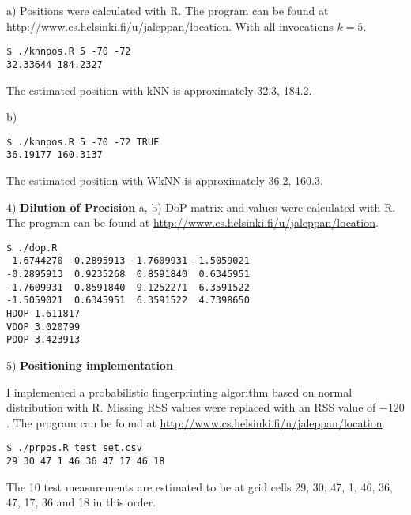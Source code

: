 \documentclass[a4paper,parskip=full]{scrartcl}
\begin{document}
a) Positions were calculated with R. The program can be found at
\url{http://www.cs.helsinki.fi/u/jaleppan/location}.
With all invocations $k = 5$.
\begin{verbatim}
$ ./knnpos.R 5 -70 -72
32.33644 184.2327
\end{verbatim}
The estimated position with kNN is approximately 32.3, 184.2.

b)
\begin{verbatim}
$ ./knnpos.R 5 -70 -72 TRUE
36.19177 160.3137
\end{verbatim}
The estimated position with WkNN is approximately 36.2, 160.3.

4) \textbf{Dilution of Precision}
a, b) DoP matrix and values were calculated with R. The program can be found at
\url{http://www.cs.helsinki.fi/u/jaleppan/location}.
\begin{verbatim}
$ ./dop.R
 1.6744270 -0.2895913 -1.7609931 -1.5059021
-0.2895913  0.9235268  0.8591840  0.6345951
-1.7609931  0.8591840  9.1252271  6.3591522
-1.5059021  0.6345951  6.3591522  4.7398650
HDOP 1.611817
VDOP 3.020799
PDOP 3.423913
\end{verbatim}

5) \textbf{Positioning implementation}

I implemented a probabilistic fingerprinting algorithm based on normal
distribution with R. Missing RSS values were replaced with an RSS value of $-120$.
The program can be found at \url{http://www.cs.helsinki.fi/u/jaleppan/location}.
\begin{verbatim}
$ ./prpos.R test_set.csv 
29 30 47 1 46 36 47 17 46 18
\end{verbatim}
The 10 test measurements are estimated to be at grid cells 29, 30, 47, 1, 46,
36, 47, 17, 36 and 18 in this order.



\end{document}
